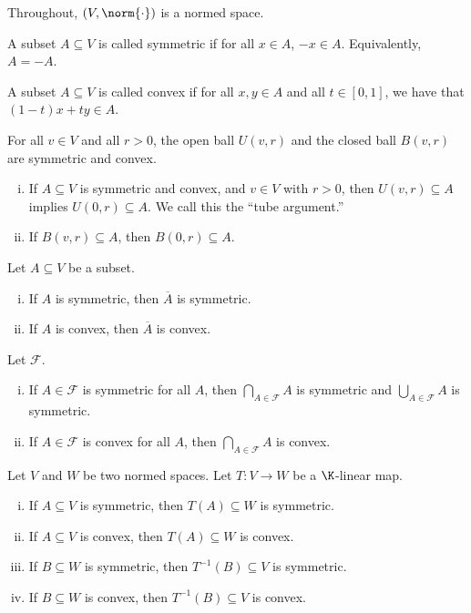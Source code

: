 \documentclass[10pt]{mypackage}
\begin{document}
Throughout, $\left( V,\norm{\cdot} \right)$ is a normed space.
\begin{definition}
  A subset $A\subseteq V$ is called symmetric if for all $x\in A$, $-x\in A$. Equivalently, $A = -A$.
\end{definition}
\begin{definition}
  A subset $A\subseteq V$ is called convex if for all $x,y\in A$ and all $t\in [0,1]$, we have that $\left( 1-t \right)x + ty \in A$.
\end{definition}
\begin{proposition}
For all $v\in V$ and all $r > 0$, the open ball $U\left( v,r \right)$ and the closed ball $B\left( v,r \right)$ are symmetric and convex.
\end{proposition}
\begin{proposition}\hfill
  \begin{enumerate}[(i)]
    \item If $A\subseteq V$ is symmetric and convex, and $v\in V$ with $r > 0$, then $U\left( v,r \right)\subseteq A$ implies $U\left( 0,r \right)\subseteq A$. We call this the ``tube argument.''
    \item If $B\left( v,r \right)\subseteq A$, then $B\left( 0,r \right)\subseteq A$.
  \end{enumerate}
\end{proposition}
\begin{proposition}
  Let $A\subseteq V$ be a subset.
  \begin{enumerate}[(i)]
    \item If $A$ is symmetric, then $ \overline{A} $ is symmetric.
    \item If $A$ is convex, then $ \overline{A} $ is convex.
  \end{enumerate}
\end{proposition}
\begin{proposition}
  Let $ \mathcal{F} $.
  \begin{enumerate}[(i)]
    \item If $A\in \mathcal{F}$ is symmetric for all $A$, then $\bigcap_{A\in \mathcal{F}}A$ is symmetric and $\bigcup_{A\in \mathcal{F}}A$ is symmetric.
    \item If $A\in \mathcal{F}$ is convex for all $A$, then $\bigcap_{A\in \mathcal{F}}A$ is convex.
  \end{enumerate}
\end{proposition}
\begin{proposition}
  Let $V$ and $W$ be two normed spaces. Let $T\colon V\to W$ be a $\K$-linear map.
  \begin{enumerate}[(i)]
    \item If $A\subseteq V$ is symmetric, then $T(A)\subseteq W$ is symmetric.
    \item If $A\subseteq V$ is convex, then $T(A)\subseteq W$ is convex.
    \item If $B\subseteq W$ is symmetric, then $T^{-1}\left( B \right)\subseteq V$ is symmetric.
    \item If $B\subseteq W$ is convex, then $T^{-1}\left( B \right)\subseteq V$ is convex.
  \end{enumerate}
\end{proposition}
\end{document}
